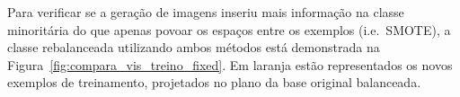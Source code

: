 \begin{itemize}

Para verificar se a geração de imagens inseriu mais informação na classe minoritária do que apenas povoar os espaços entre os exemplos (i.e.\ SMOTE), a classe rebalanceada utilizando ambos métodos está demonstrada na Figura~\ref{fig:compara_vis_treino_fixed}. Em laranja estão representados os novos exemplos de treinamento, projetados no plano da base original balanceada.


\end{itemize}
